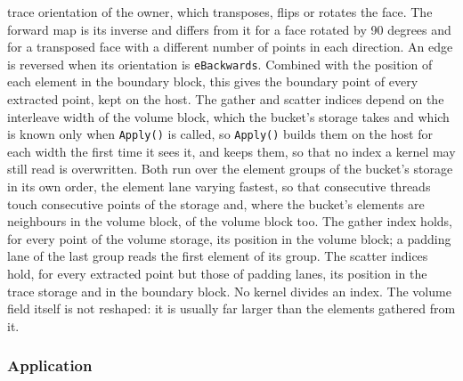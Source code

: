\begin{enumerate}
    trace orientation of the owner, which transposes, flips or rotates the
    face. The forward map is its inverse and differs from it for a face
    rotated by 90 degrees and for a transposed face with a different number
    of points in each direction. An edge is reversed when its
    orientation is \texttt{eBackwards}. Combined with the position of each
    element in the boundary block, this gives the boundary point of every
    extracted point, kept on the host. The gather and scatter indices
    depend on the interleave width of the volume block, which the bucket's
    storage takes and which is known only when \texttt{Apply()} is called,
    so \texttt{Apply()} builds them on the host for each width the first
    time it sees it, and keeps them, so that no index a kernel may still
    read is overwritten. Both run over the element groups of the bucket's
    storage in its own order, the element lane varying fastest, so that
    consecutive threads touch consecutive points of the storage and, where
    the bucket's elements are neighbours in the volume block, of the volume
    block too. The gather index holds, for every point of the volume
    storage, its position in the volume block; a padding lane of the last
    group reads the first element of its group. The scatter indices hold,
    for every extracted point but those of padding lanes, its position in
    the trace storage and in the boundary block. No kernel divides an index.
    The volume field itself is not reshaped: it is usually far larger than
    the elements gathered from it.
\end{enumerate}

\subsubsection*{Application}

